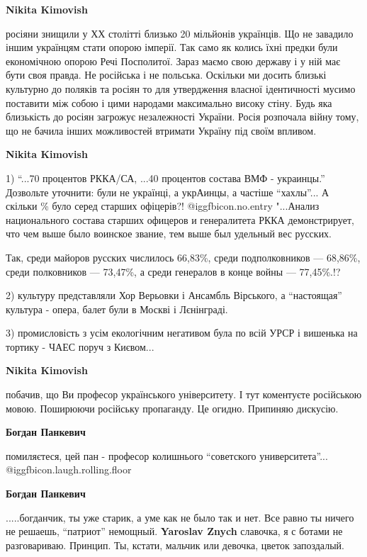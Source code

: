 \begin{itemize}
\begin{itemize}
\textbf{Nikita Kimovish} 

росіяни знищили у ХХ столітті близько 20 мільйонів українців. Що не завадило
іншим українцям стати опорою імперії. Так само як колись їхні предки були
економічною опорою Речі Посполитої. Зараз маємо свою державу і у ній має бути
своя правда. Не російська і не польська. Оскільки ми досить близькі культурно
до поляків та росіян то для утвердження власної ідентичності мусимо поставити
між собою і цими народами максимально високу стіну. Будь яка близькість до
росіян загрожує незалежності України. Росія розпочала війну тому, що не бачила
інших можливостей втримати Україну під своїм впливом.

\textbf{Nikita Kimovish} 

1) \enquote{...70 процентов РККА/СА, ...40 процентов состава ВМФ - украинцы.} Дозвольте
уточнити: були не українці, а укрАинцы, а частіше \enquote{хахлы}... А скільки \% було
серед старших офіцерів?! @igg{fbicon.no.entry} ️ "...Анализ национального состава старших офицеров и
генералитета РККА демонстрирует, что чем выше было воинское звание, тем выше
был удельный вес русских.

Так, среди майоров русских числилось 66,83\%, среди подполковников — 68,86\%,
среди полковников — 73,47\%, а среди генералов в конце войны — 77,45\%.!?

2) культуру представляли Хор Верьовки і Ансамбль Вірського, а \enquote{настоящая}
культура - опера, балет були в Москві і Лєнінграді. 

3) промисловість з усім екологічним негативом була по всій УРСР і вишенька на
тортику - ЧАЕС поруч з Києвом...

\textbf{Nikita Kimovish} 

побачив, що Ви професор українського університету. І тут коментуєте російською
мовою. Поширюючи російську пропаганду. Це огидно. Припиняю дискусію.

\textbf{Богдан Панкевич} 

помиляєтеся, цей пан - професор колишнього \enquote{советского университета}...
@igg{fbicon.laugh.rolling.floor} 

\textbf{Богдан Панкевич} 

.....богданчик, ты уже старик, а уме как не было так и нет. Все равно ты ничего
не решаешь, \enquote{патриот} немощный. \textbf{Yaroslav Znych} славочка, я с ботами не
разговариваю. Принцип. Ты, кстати, мальчик или девочка, цветок запоздалый.


\end{itemize}
\end{itemize}
